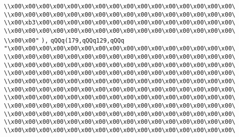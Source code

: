 \verb|\\x00\x00\x00\x00\x00\x00\x00\x00\x00\x00\x00\x00\x00\x00\x00\x00\|\newline
\verb|\\x00\x00\x00\x00\x00\x00\x00\x00\x00\x00\x00\x00\x00\x00\x00\x00\|\newline
\verb|\\x00\xb3\x00\x00\x00\x00\x00\x00\x00\x00\x00\x00\x00\x00\x00\x00\|\newline
\verb|\\x00\x00\x00\x00\x00\x00\x00\x00\x00\x00\x00\x00\x00\x00\x00\x00\|\newline
\verb|\\x00\x00"|\newline
\verb|),|\newline
\verb|qQQq(179,qQQq129,qQQq|\newline
\verb|"\x00\x00\x00\x00\x00\x00\x00\x00\x00\x00\x00\x00\x00\x00\x00\x00\|\newline
\verb|\\x00\x00\x00\x00\x00\x00\x00\x00\x00\x00\x00\x00\x00\x00\x00\x00\|\newline
\verb|\\x00\x00\x00\x00\x00\x00\x00\x00\x00\x00\x00\x00\x00\x00\x00\x00\|\newline
\verb|\\x00\x00\x00\x00\x00\x00\x00\x00\x00\x00\x00\x00\x00\x00\x00\x00\|\newline
\verb|\\x00\x00\x00\x00\x00\x00\x00\x00\x00\x00\x00\x00\x00\x00\x00\x00\|\newline
\verb|\\x00\x00\x00\x00\x00\x00\x00\x00\x00\x00\x00\x00\x00\x00\x00\x00\|\newline
\verb|\\x00\x00\x00\x00\x00\x00\x00\x00\x00\x00\x00\x00\x00\x00\x00\x00\|\newline
\verb|\\x00\x00\x00\x00\x00\x00\x00\x00\x00\x00\x00\x00\x00\x00\x00\x00\|\newline
\verb|\\x00\x00\x00\x00\x00\x00\x00\x00\x00\x00\x00\x00\x00\x00\x00\x00\|\newline
\verb|\\x00\x00\x00\x00\x00\x00\x00\x00\x00\x00\x00\x00\x00\x00\x00\x00\|\newline
\verb|\\x00\x00\x00\x00\x00\x00\x00\x00\x00\x00\x00\x00\x00\x00\x00\x00\|\newline
